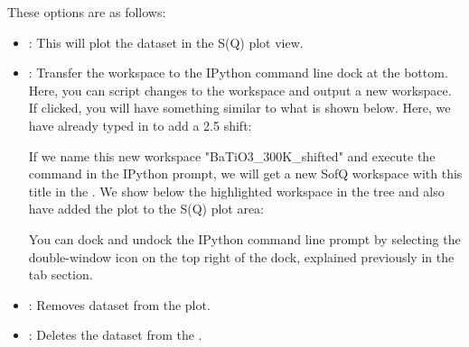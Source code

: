 These options are as follows:
\begin{itemize}

\item {}: This will plot the dataset in the S(Q) plot view.
\item {}: Transfer the workspace to the IPython command line dock at the bottom. Here, you can script changes to the workspace and output a new workspace. If clicked, you will have something similar to what is shown below. Here, we have already typed in to add a 2.5 shift:

\noindent{}

If we name this new workspace "BaTiO3\_300K\_shifted" and execute the command in the IPython prompt, we will get a new SofQ workspace with this title in the . We show below the highlighted workspace in the tree and also have added the plot to the S(Q) plot area: 

\noindent{}

You can dock and undock the IPython command line prompt by selecting the double-window icon on the top right of the dock, explained previously in the  tab section.

\item {}: Removes dataset from the plot.
\item {}: Deletes the dataset from the .

\end{itemize}


